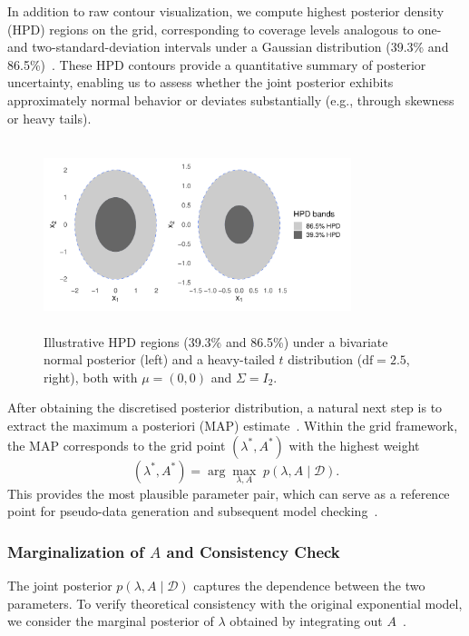 In addition to raw contour visualization, we compute highest posterior density (HPD) regions on the grid, corresponding to coverage levels analogous to one- and two-standard-deviation intervals under a Gaussian distribution (39.3\% and 86.5\%)~\cite{kocev2021modeling}. These HPD contours provide a quantitative summary of posterior uncertainty, enabling us to assess whether the joint posterior exhibits approximately normal behavior or deviates substantially (e.g., through skewness or heavy tails).
\begin{figure}[H]
    \centering
    \includegraphics[height=5.5cm, width=0.8\textwidth]{images/hpd_normal_vs_student-t.pdf}
    \caption{{\small Illustrative HPD regions (39.3\% and 86.5\%) under a bivariate normal posterior (left) and a heavy-tailed $t$ distribution ($\text{df}=2.5$, right), both with $\mu=(0,0)$ and $\Sigma=I_2$.}}
    \label{fig:hpd-example}
\end{figure}
After obtaining the discretised posterior distribution, a natural next step is to extract the maximum a posteriori (MAP) estimate~\cite{gelman1995bayesian}. Within the grid framework, the MAP corresponds to the grid point $(\lambda^*, A^*)$ with the highest weight
\begin{equation}
    (\lambda^*, A^*) = \arg\max_{\lambda,A} \; p(\lambda,A \mid \mathcal D).
\end{equation}
This provides the most plausible parameter pair, which can serve as a reference point for pseudo-data generation and subsequent model checking~\cite{robert2007bayesian, gelman1995bayesian}.



\subsubsection{Marginalization of \texorpdfstring{$A$}{A} and Consistency Check}
\label{边际化章节}
The joint posterior $p(\lambda, A \mid \mathcal D)$ captures the dependence between the two parameters. To verify theoretical consistency with the original exponential model, we consider the marginal posterior of $\lambda$ obtained by integrating out $A$~\cite{gelman1995bayesian}.   


